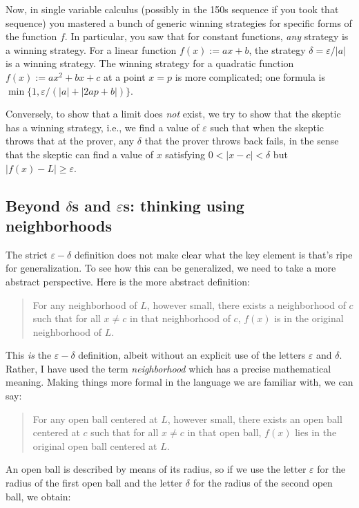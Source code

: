 \documentclass[10pt]{amsart}
\begin{document}
Now, in single variable calculus (possibly in the 150s sequence if you
took that sequence) you mastered a bunch of generic winning strategies
for specific forms of the function $f$. In particular, you saw that
for constant functions, {\em any} strategy is a winning strategy. For
a linear function $f(x) := ax + b$, the strategy $\delta =
\varepsilon/|a|$ is a winning strategy. The winning strategy for a
quadratic function $f(x) := ax^2 + bx + c$ at a point $x = p$ is more
complicated; one formula is $\min\{1, \varepsilon/(|a| + |2ap + b|) \}$.

Conversely, to show that a limit does {\em not} exist, we try to show
that the skeptic has a winning strategy, i.e., we find a value of
$\varepsilon$ such that when the skeptic throws that at the prover, any
$\delta$ that the prover throws back fails, in the sense that the
skeptic can find a value of $x$ satisfying $0 < |x - c| < \delta$ but
$|f(x) - L| \ge \varepsilon$.

\subsection{Beyond $\delta$s  and $\varepsilon$s: thinking using neighborhoods}

The strict $\varepsilon-\delta$ definition does not make clear what the
key element is that's ripe for generalization. To see how this can be
generalized, we need to take a more abstract perspective. Here is the
more abstract definition:

\begin{quote}
  For any neighborhood of $L$, however small, there exists a
  neighborhood of $c$ such that for all $x \ne c$ in that neighborhood
  of $c$, $f(x)$ is in the original neighborhood of $L$.
\end{quote}

This {\em is} the $\varepsilon-\delta$ definition, albeit without an
explicit use of the letters $\varepsilon$ and $\delta$. Rather, I have
used the term {\em neighborhood} which has a precise mathematical
meaning. Making things more formal in the language we are familiar
with, we can say:

\begin{quote}
  For any open ball centered at $L$, however small, there exists an
  open ball centered at $c$ such that for all $x \ne c$ in that open
  ball, $f(x)$ lies in the original open ball centered at $L$.
\end{quote}

An open ball is described by means of its radius, so if we use the
letter $\varepsilon$ for the radius of the first open ball and the letter
$\delta$ for the radius of the second open ball, we obtain:
\end{document}
